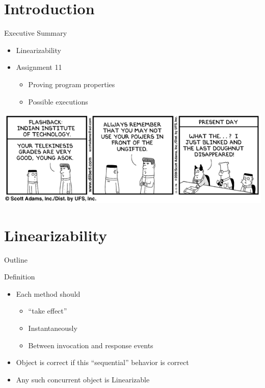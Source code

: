 \section*{Introduction}

\begin{frame}{Executive Summary}
  \begin{itemize}
  \item Linearizability
  \item Assignment 11
    \begin{itemize}
    \item Proving program properties
    \item Possible executions
    \end{itemize}
  \end{itemize}


  \begin{center}
    \includegraphics[scale=0.4]{figures/dilbert-iit}
  \end{center}
\end{frame}


\section{Linearizability}

\begin{frame}{Outline}
  \tableofcontents[current]
\end{frame}

\begin{frame}{Definition}
  \begin{itemize}
  \item Each method should
    \begin{itemize}
    \item ``take effect''
    \item Instantaneously
    \item Between invocation and response events
    \end{itemize}
  \item Object is correct if this ``sequential'' behavior is correct
  \item Any such concurrent object is \alert{Linearizable}
  \end{itemize}
\end{frame}

